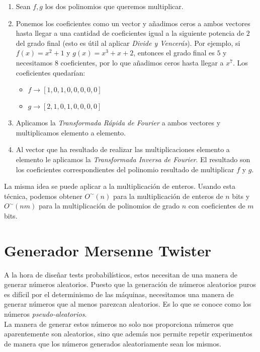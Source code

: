 \begin{enumerate}
	\item Sean $f, g$ los dos polinomios que queremos multiplicar.
	
	\item Ponemos los coeficientes como un vector y añadimos ceros a ambos vectores hasta llegar a una cantidad de coeficientes igual a la siguiente potencia de $2$ del grado final (esto es útil al aplicar \textit{Divide y Vencerás}). Por ejemplo, si $f(x) = x^2 + 1$ y $g(x) = x^3 + x + 2$, entonces el grado final es $5$ y necesitamos 8 coeficientes, por lo que añadimos ceros hasta llegar a $x^7$. Los coeficientes quedarían:
	
	\begin{itemize}
		\item $f\rightarrow[1, 0, 1, 0, 0, 0, 0, 0]$
		\item $g\rightarrow[2, 1, 0, 1, 0, 0, 0, 0]$
	\end{itemize}
	
	\item Aplicamos la \textit{Transformada Rápida de Fourier} a ambos vectores y multiplicamos elemento a elemento.
	
	\item Al vector que ha resultado de realizar las multiplicaciones elemento a elemento le aplicamos la \textit{Transformada Inversa de Fourier}. El resultado son los coeficientes correspondientes del polinomio resultado de multiplicar $f$ y $g$.
\end{enumerate}

La misma idea se puede aplicar a la multiplicación de enteros. Usando esta técnica, podemos obtener $O^\sim(n)$ para la multiplicación de enteros de $n$ bits y $O^\sim(nm)$ para la multiplicación de polinomios de grado $n$ con coeficientes de $m$ bits.

\section{Generador Mersenne Twister}

A la hora de diseñar tests probabilísticos, estos necesitan de una manera de generar números aleatorios. Puesto que la generación de números aleatorios puros es difícil por el determinismo de las máquinas, necesitamos una manera de generar números que al menos parezcan aleatorios. Es lo que se conoce como los números \textit{pseudo-aleatorios}.\\

La manera de generar estos números no solo nos proporciona números que aparentemente son aleatorios, sino que además nos permite repetir experimentos de manera que los números generados aleatoriamente sean los mismos.\\


